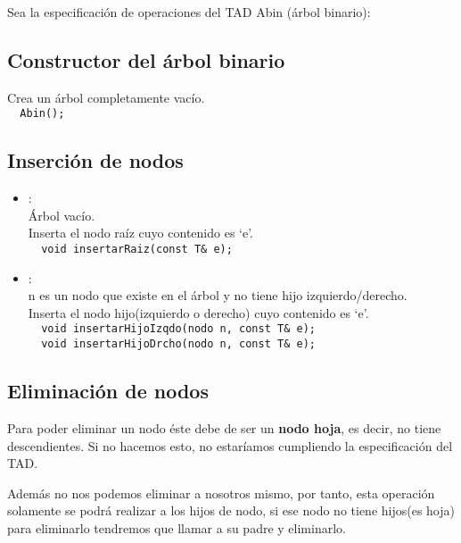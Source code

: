 Sea la especificación de operaciones del TAD Abin (árbol binario):
\subsection*{Constructor del árbol binario}
   Crea un árbol completamente vacío.\\
  \verb|  Abin();|

\subsection*{Inserción de nodos}
\begin{itemize}
  \item {}:\\
   Árbol vacío.\\
   Inserta el nodo raíz cuyo contenido es `e'.\\
  \verb|  void insertarRaiz(const T& e);|
  \item {}:\\
   n es un nodo que existe en el árbol y no tiene hijo izquierdo/derecho.\\
   Inserta el nodo hijo(izquierdo o derecho) cuyo contenido es `e'.\\
  \verb|  void insertarHijoIzqdo(nodo n, const T& e);|\\
  \verb|  void insertarHijoDrcho(nodo n, const T& e);|
\end{itemize}

\subsection*{Eliminación de nodos}
Para poder eliminar un nodo éste debe de ser un \textbf{nodo hoja}, es decir, no tiene descendientes. Si no hacemos esto, no estaríamos cumpliendo la especificación del TAD.

Además no nos podemos eliminar a nosotros mismo, por tanto, esta operación solamente se podrá realizar a los hijos de nodo, si ese nodo no tiene hijos(es hoja) para eliminarlo tendremos que llamar a su padre y eliminarlo.

